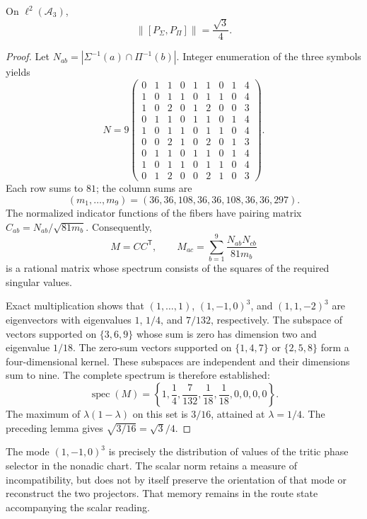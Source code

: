\begin{proposition}
On \(\ell^2(\mathcal A_3)\),
\begin{equation}
 \|[P_\Sigma,P_\Pi]\|=\frac{\sqrt3}{4}.
 \label{eq:el-prefactor}
\end{equation}
\end{proposition}
\begin{proof}
Let \(N_{ab}=|\Sigma^{-1}(a)\cap\Pi^{-1}(b)|\). Integer enumeration
of the three symbols yields
\[
 N=9\begin{pmatrix}
 0&1&1&0&1&1&0&1&4\\
 1&0&1&1&0&1&1&0&4\\
 1&0&2&0&1&2&0&0&3\\
 0&1&1&0&1&1&0&1&4\\
 1&0&1&1&0&1&1&0&4\\
 0&0&2&1&0&2&0&1&3\\
 0&1&1&0&1&1&0&1&4\\
 1&0&1&1&0&1&1&0&4\\
 0&1&2&0&0&2&1&0&3
 \end{pmatrix}.
\]
Each row sums to \(81\); the column sums are
\[
 (m_1,\ldots,m_9)=(36,36,108,36,36,108,36,36,297).
\]
The normalized indicator functions of the fibers have pairing
matrix \(C_{ab}=N_{ab}/\sqrt{81m_b}\). Consequently,
\[
 M=CC^{\mathsf T},\qquad
 M_{ac}=\sum_{b=1}^9\frac{N_{ab}N_{cb}}{81m_b}
\]
is a rational matrix whose spectrum consists of the squares of the
required singular values.

Exact multiplication shows that \((1,\ldots,1)\),
\((1,-1,0)^3\), and \((1,1,-2)^3\) are eigenvectors with eigenvalues
\(1\), \(1/4\), and \(7/132\), respectively. The subspace of
vectors supported on \(\{3,6,9\}\) whose sum is zero has dimension
two and eigenvalue \(1/18\). The zero-sum vectors supported on
\(\{1,4,7\}\) or \(\{2,5,8\}\) form a four-dimensional
kernel. These subspaces are independent and their dimensions sum to
nine. The complete spectrum is therefore established:
\[
 \operatorname{spec}(M)=
 \left\{1,\frac14,\frac7{132},\frac1{18},\frac1{18},0,0,0,0\right\}.
\]
The maximum of \(\lambda(1-\lambda)\) on this set is \(3/16\),
attained at \(\lambda=1/4\). The preceding lemma gives
\(\sqrt{3/16}=\sqrt3/4\).
\end{proof}

The mode \((1,-1,0)^3\) is precisely the distribution of values of the
tritic phase selector in the nonadic chart. The scalar norm retains
a measure of incompatibility, but does not by itself preserve the
orientation of that mode or reconstruct the two projectors. That memory
remains in the route state accompanying the scalar reading.

